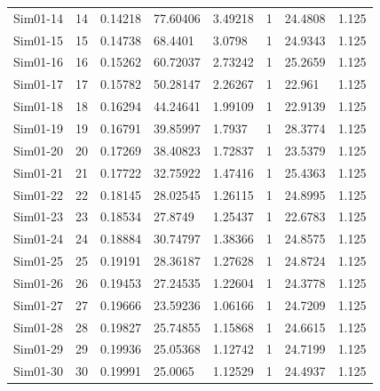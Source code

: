 \documentclass [10pt] {article}
\begin{document}
\begin{table}[H]
\begin{tabular}{c|cllllll}
		Sim01-14 & 14         & 0.14218                         & 77.60406      & 3.49218   & 1              & 24.4808       & 1.125     \\
		Sim01-15 & 15         & 0.14738                         & 68.4401       & 3.0798    & 1              & 24.9343       & 1.125     \\
		Sim01-16 & 16         & 0.15262                         & 60.72037      & 2.73242   & 1              & 25.2659       & 1.125     \\
		Sim01-17 & 17         & 0.15782                         & 50.28147      & 2.26267   & 1              & 22.961        & 1.125     \\
		Sim01-18 & 18         & 0.16294                         & 44.24641      & 1.99109   & 1              & 22.9139       & 1.125     \\
		Sim01-19 & 19         & 0.16791                         & 39.85997      & 1.7937    & 1              & 28.3774       & 1.125     \\
		Sim01-20 & 20         & 0.17269                         & 38.40823      & 1.72837   & 1              & 23.5379       & 1.125     \\
		Sim01-21 & 21         & 0.17722                         & 32.75922      & 1.47416   & 1              & 25.4363       & 1.125     \\
		Sim01-22 & 22         & 0.18145                         & 28.02545      & 1.26115   & 1              & 24.8995       & 1.125     \\
		Sim01-23 & 23         & 0.18534                         & 27.8749       & 1.25437   & 1              & 22.6783       & 1.125     \\
		Sim01-24 & 24         & 0.18884                         & 30.74797      & 1.38366   & 1              & 24.8575       & 1.125     \\
		Sim01-25 & 25         & 0.19191                         & 28.36187      & 1.27628   & 1              & 24.8724       & 1.125     \\
		Sim01-26 & 26         & 0.19453                         & 27.24535      & 1.22604   & 1              & 24.3778       & 1.125     \\
		Sim01-27 & 27         & 0.19666                         & 23.59236      & 1.06166   & 1              & 24.7209       & 1.125     \\
		Sim01-28 & 28         & 0.19827                         & 25.74855      & 1.15868   & 1              & 24.6615       & 1.125     \\
		Sim01-29 & 29         & 0.19936                         & 25.05368      & 1.12742   & 1              & 24.7199       & 1.125     \\
		Sim01-30 & 30         & 0.19991                         & 25.0065       & 1.12529   & 1              & 24.4937       & 1.125    
	\end{tabular}
\end{table}
\end{document}
